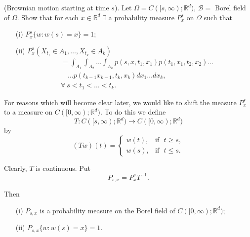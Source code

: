 \begin{exer*}
(Brownian motion starting at time $s$). Let
  $\Omega=C([s,\infty);\mathbb{R}^{d})$, $\mathscr{B}=$ Borel field of
    $\Omega$. Show that for each $x\in \mathbb{R}^{d}\;\exists$ a
    probability measure $P^{s}_{x}$ on $\Omega$ such that
\begin{itemize}
\item[(i)] $P^{s}_{x}\{w:w(s)=x\}=1$;\pageoriginale

\item[(ii)] $P^{s}_{x}(X_{t_{1}}\in A_{1},\ldots,X_{t_{k}}\in A_{k})$
\begin{align*}
& =\int_{A_{1}}\int_{A_{2}}\ldots
\int_{A_{k}}p(s,x,t_{1},x_{1})p(t_{1},x_{1},t_{2},x_{2})\ldots\\
&\quad\ldots p(t_{k-1}x_{k-1},t_{k},x_{k})dx_{1}\ldots dx_{k},\\
& \forall\ s < t_{1} < \ldots < t_{k}.
\end{align*}
\end{itemize}

For reasons which will become clear later, we would like to shift the
measure $P^{s}_{x}$ to a measure on $C([0,\infty);\mathbb{R}^{d})$. To
  do this we define
$$
T:C([s,\infty);\mathbb{R}^{d})\to C([0,\infty);\mathbb{R}^{d})
$$
by
$$
(Tw)(t)=
\begin{cases}
w(t), & \text{if~ }t\geq s,\\
w(s), & \text{if~ } t\leq s.
\end{cases}
$$

Clearly, $T$ is continuous. Put
$$
P_{s,x}=P^{s}_{x}T^{-1}.
$$

Then 
\begin{itemize}
\item[(i)] $P_{s,x}$ is a probability measure on the Borel field of
  $C([0,\infty);\mathbb{R}^{d})$;

\item[(ii)] $P_{s,x}\{w:w(s)=x\}=1$.
\end{itemize}
\end{exer*}

